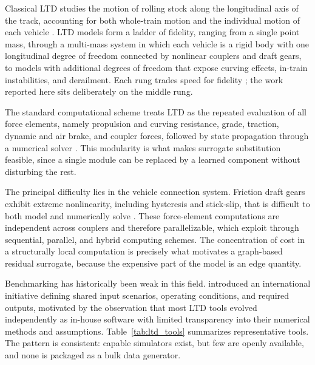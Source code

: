 \documentclass[numbered]{trbunofficial}
\begin{document}
Classical LTD studies the motion of rolling stock along the longitudinal axis of the track, accounting for both whole-train motion and the individual motion of each vehicle \citep{Cole2006HandbookLTD}. LTD models form a ladder of fidelity, ranging from a single point mass, through a multi-mass system in which each vehicle is a rigid body with one longitudinal degree of freedom connected by nonlinear couplers and draft gears, to models with additional degrees of freedom that expose curving effects, in-train instabilities, and derailment. Each rung trades speed for fidelity \citep{Wu2016OverviewLTD}; the work reported here sits deliberately on the middle rung.

The standard computational scheme treats LTD as the repeated evaluation of all force elements, namely propulsion and curving resistance, grade, traction, dynamic and air brake, and coupler forces, followed by state propagation through a numerical solver \citep{Wu2018ComputingSchemesLTD}. This modularity is what makes surrogate substitution feasible, since a single module can be replaced by a learned component without disturbing the rest.

The principal difficulty lies in the vehicle connection system. Friction draft gears exhibit extreme nonlinearity, including hysteresis and stick-slip, that is difficult to both model and numerically solve \citep{Wu2016OverviewLTD}. These force-element computations are independent across couplers and therefore parallelizable, which \citet{Wu2018ComputingSchemesLTD} exploit through sequential, parallel, and hybrid computing schemes. The concentration of cost in a structurally local computation is precisely what motivates a graph-based residual surrogate, because the expensive part of the model is an edge quantity.

Benchmarking has historically been weak in this field. \citet{Spiryagin2017BenchmarkQuestions} introduced an international initiative defining shared input scenarios, operating conditions, and required outputs, motivated by the observation that most LTD tools evolved independently as in-house software with limited transparency into their numerical methods and assumptions. Table~\ref{tab:ltd_tools} summarizes representative tools. The pattern is consistent: capable simulators exist, but few are openly available, and none is packaged as a bulk data generator.
\end{document}

